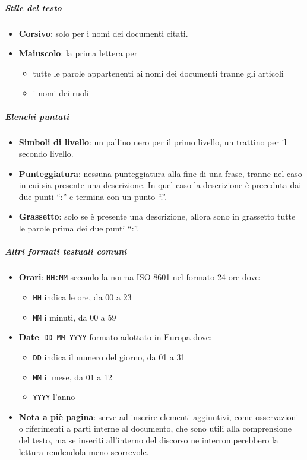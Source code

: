 			\subparagraph{Stile del testo}\label{PS:Documentazione:Design:NormeT:StileTesto}
			\begin{itemize}
				\item \textbf{Corsivo}: solo per i nomi dei documenti citati.
				\item \textbf{Maiuscolo}: la prima lettera per
				\begin{itemize}
					\item tutte le parole appartenenti ai nomi dei documenti tranne gli articoli
					\item i nomi dei ruoli
				\end{itemize}
			\end{itemize}

			\subparagraph{Elenchi puntati}\label{PS:Documentazione:Design:NormeT:ElenchiPuntati}
			\begin{itemize}
				\item \textbf{Simboli di livello}: un pallino nero per il primo livello, un trattino per il secondo livello.
				\item \textbf{Punteggiatura}: nessuna punteggiatura alla fine di una frase, tranne nel caso in cui sia presente una descrizione.
					In quel caso la descrizione è preceduta dai due punti ``:'' e termina con un punto ``.''.
				\item \textbf{Grassetto}: solo se è presente una descrizione, allora sono in grassetto tutte le parole prima dei due punti ``:''.
			\end{itemize}

			\subparagraph{Altri formati testuali comuni} \label{PS:Documentazione:Design:NormeT:AltriFormati}
			\begin{itemize}
				\item \textbf{Orari}: \texttt{HH:MM} secondo la norma ISO 8601 nel formato 24 ore dove:
				\begin{itemize}
					\item \texttt{HH} indica le ore, da 00 a 23
					\item \texttt{MM} i minuti, da 00 a 59
				\end{itemize}
				\item \textbf{Date}: \texttt{DD-MM-YYYY} formato adottato in Europa dove:
				\begin{itemize}
					\item \texttt{DD} indica il numero del giorno, da 01 a 31
					\item \texttt{MM} il mese, da 01 a 12
					\item \texttt{YYYY} l'anno
				\end{itemize}
				\item \textbf{Nota a piè pagina}: serve ad inserire elementi aggiuntivi, come osservazioni o riferimenti a parti interne al documento,
				che sono utili alla comprensione del testo, ma se inseriti all'interno del discorso ne interromperebbero la lettura rendendola meno scorrevole.
			\end{itemize}


